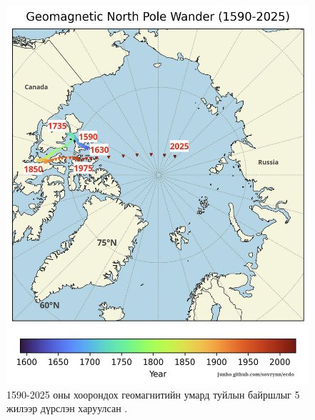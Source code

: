 \documentclass[10pt,twocolumn,letterpaper]{article}
\begin{document}
\begin{figure}[t]
\begin{center}
   \includegraphics[width=1\linewidth]{npw.jpg}
\end{center}
   \caption{1590-2025 оны хоорондох геомагнитийн умард туйлын байршлыг 5 жилээр дүрслэн харуулсан \cite{142}.}
\label{fig:13}

\label{fig:onecol}
\end{figure}
\end{document}
